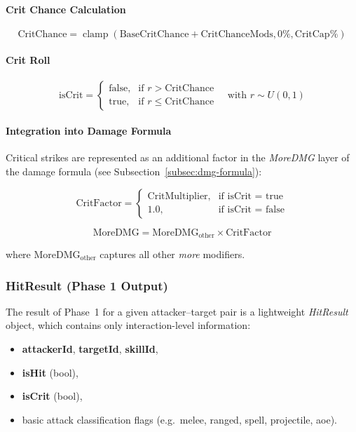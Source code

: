 \paragraph{Crit Chance Calculation}

\[
\text{CritChance} =
\operatorname{clamp}\!\left(
\text{BaseCritChance} + \text{CritChanceMods},
0\%,
\text{CritCap\%}
\right)
\]

\paragraph{Crit Roll}

\[
\text{isCrit} =
\begin{cases}
	\text{false}, & \text{if } r > \text{CritChance} \\
	\text{true},  & \text{if } r \le \text{CritChance}
\end{cases}
\quad\text{with } r \sim U(0,1)
\]

\paragraph{Integration into Damage Formula}

Critical strikes are represented as an additional factor in the \emph{MoreDMG}
layer of the damage formula (see Subsection~\ref{subsec:dmg-formula}):

\[
\text{CritFactor} =
\begin{cases}
	\text{CritMultiplier}, & \text{if isCrit = true} \\
	1.0,                   & \text{if isCrit = false}
\end{cases}
\]

\[
\text{MoreDMG} = \text{MoreDMG}_{\text{other}} \times \text{CritFactor}
\]

\noindent
where $\text{MoreDMG}_{\text{other}}$ captures all other \emph{more} modifiers.

\subsubsection{HitResult (Phase 1 Output)}

The result of Phase~1 for a given attacker--target pair is a lightweight
\emph{HitResult} object, which contains only interaction-level information:

\begin{itemize}
	\item \textbf{attackerId}, \textbf{targetId}, \textbf{skillId},
	\item \textbf{isHit} (bool),
	\item \textbf{isCrit} (bool),
	\item basic attack classification flags (e.g.\ melee, ranged, spell, projectile, aoe).
\end{itemize}

